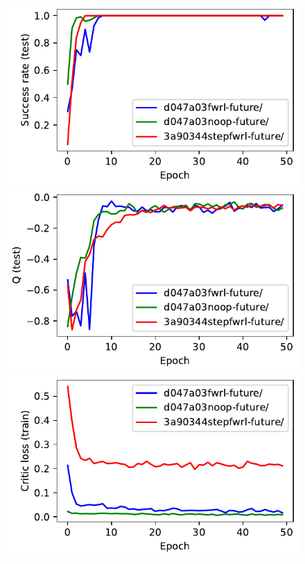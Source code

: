 %
\begin{figure}%
  \def\frac{0.24}
  \includegraphics[width=\frac\columnwidth]{media/res/3a90344-FetchReach-v1-stepfwrl-future/test/success_rate.pdf}%
  \includegraphics[width=\frac\columnwidth]{media/res/3a90344-FetchReach-v1-stepfwrl-future/test/mean_Q.pdf}%
  \includegraphics[width=\frac\columnwidth]{media/res/3a90344-FetchReach-v1-stepfwrl-future/train/critic_loss.pdf}%

\end{figure}
